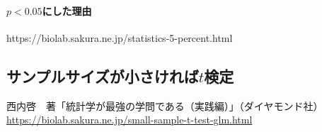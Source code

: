 \paragraph{$p<0.05$にした理由}
https://biolab.sakura.ne.jp/statistics-5-percent.html
\fi



\subsection{サンプルサイズが小さければ$t$検定}
西内啓　著「統計学が最強の学問である（実践編）」（ダイヤモンド社）
\url{https://biolab.sakura.ne.jp/small-sample-t-test-glm.html}
\fi 
